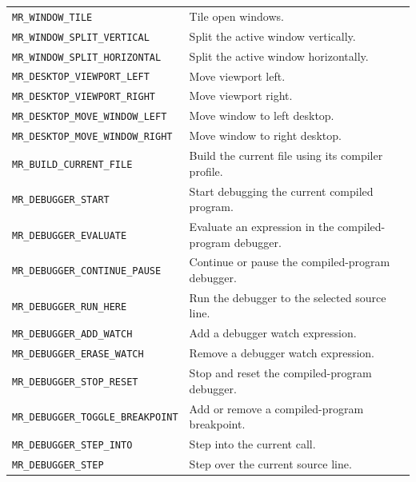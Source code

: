 \documentclass[a4paper,10pt,twoside,openany]{book}
\newenvironment{mrmacextension}{\begin{changebar}}{\end{changebar}}
\begin{document}
\begin{mrmacextension}
\begin{longtable}{@{}L{0.50\textwidth}@{\hspace{0.8em}}L{0.40\textwidth}@{}}
\texttt{MR\_WINDOW\_TILE} & Tile open windows. \\
\texttt{MR\_WINDOW\_SPLIT\_VERTICAL} & Split the active window vertically. \\
\texttt{MR\_WINDOW\_SPLIT\_HORIZONTAL} & Split the active window horizontally. \\
\texttt{MR\_DESKTOP\_VIEWPORT\_LEFT} & Move viewport left. \\
\texttt{MR\_DESKTOP\_VIEWPORT\_RIGHT} & Move viewport right. \\
\texttt{MR\_DESKTOP\_MOVE\_WINDOW\_LEFT} & Move window to left desktop. \\
\texttt{MR\_DESKTOP\_MOVE\_WINDOW\_RIGHT} & Move window to right desktop. \\
\texttt{MR\_BUILD\_CURRENT\_FILE} & Build the current file using its compiler profile. \\
\texttt{MR\_DEBUGGER\_START} & Start debugging the current compiled program. \\
\texttt{MR\_DEBUGGER\_EVALUATE} & Evaluate an expression in the compiled-program debugger. \\
\texttt{MR\_DEBUGGER\_CONTINUE\_PAUSE} & Continue or pause the compiled-program debugger. \\
\texttt{MR\_DEBUGGER\_RUN\_HERE} & Run the debugger to the selected source line. \\
\texttt{MR\_DEBUGGER\_ADD\_WATCH} & Add a debugger watch expression. \\
\texttt{MR\_DEBUGGER\_ERASE\_WATCH} & Remove a debugger watch expression. \\
\texttt{MR\_DEBUGGER\_STOP\_RESET} & Stop and reset the compiled-program debugger. \\
\texttt{MR\_DEBUGGER\_TOGGLE\_BREAKPOINT} & Add or remove a compiled-program breakpoint. \\
\texttt{MR\_DEBUGGER\_STEP\_INTO} & Step into the current call. \\
\texttt{MR\_DEBUGGER\_STEP} & Step over the current source line. \\

\end{longtable}
\end{mrmacextension}
\end{document}
